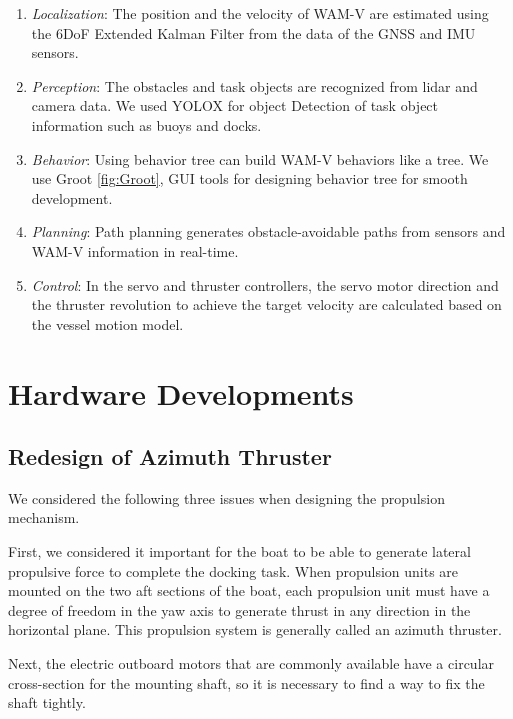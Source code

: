 \documentclass[lettersize,journal]{IEEEtran}
\begin{document}
\begin{enumerate}
  \item {\it Localization}: 
  The position and the velocity of WAM-V are estimated
  using the 6DoF Extended Kalman Filter \cite{robotx_ekf} from the data of the GNSS and IMU sensors.
    
  \item {\it Perception}: 
  The obstacles and task objects are recognized from lidar and camera data.
  We used YOLOX for object Detection of task object information such as buoys and docks.

  \item {\it Behavior}: 
  Using behavior tree can build WAM-V behaviors like a tree. 
  We use Groot \ref{fig:Groot}, GUI tools for designing behavior tree for smooth development.
  
  \item {\it Planning}: 
  Path planning generates obstacle-avoidable paths from sensors and WAM-V information in real-time.

  \item {\it Control}: 
  In the servo and thruster controllers,
  the servo motor direction and the thruster revolution
  to achieve the target velocity are calculated based on the vessel motion model.
\end{enumerate}

\section{Hardware Developments}

\subsection{Redesign of Azimuth Thruster}

We considered the following three issues when designing the propulsion mechanism.

First, we considered it important for the boat to be able to generate lateral propulsive force to complete the docking task.
When propulsion units are mounted on the two aft sections of the boat, each propulsion unit must have a degree of freedom in the yaw axis to generate thrust in any direction in the horizontal plane.
This propulsion system is generally called an azimuth thruster.

Next, the electric outboard motors that are commonly available have a circular cross-section for the mounting shaft, so it is necessary to find a way to fix the shaft tightly.
\end{document}
